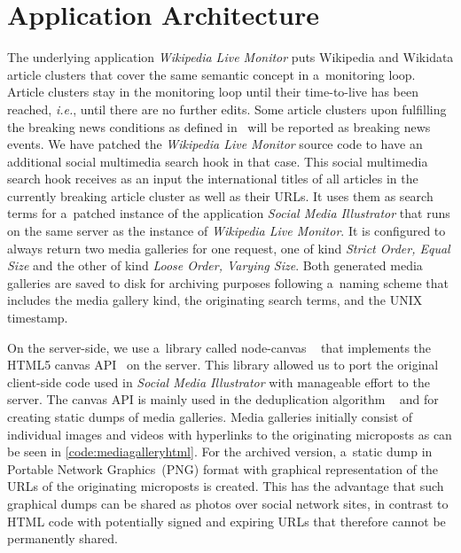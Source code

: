 \documentclass{sig-alternate}
\begin{document}
\section{Application Architecture}
\selectfont

The underlying application \emph{Wikipedia Live Monitor}
puts Wiki\-pedia and Wikidata article clusters
that cover the same semantic concept
in a~monitoring loop.
Article clusters stay in the monitoring loop until
their time-to-live has been reached,
\emph{i.e.}, until there are no further edits.
Some article clusters upon fulfilling the breaking news conditions
as defined in~\cite{steiner2013mjnomore}
will be reported as breaking news events.
We have patched the \emph{Wikipedia Live Monitor} source code
to have an additional social multimedia search hook in that case.
This social multimedia search hook receives as an input
the international titles of all articles
in the currently breaking article cluster as well as their URLs.
It uses them as search terms for a~patched instance
of the application \emph{Social Media Illustrator}
that runs on the same server
as the instance of \emph{Wikipedia Live Monitor}.
It is configured to always return two media galleries
for one request, one of kind \emph{Strict Order, Equal Size}
and the other of kind \emph{Loose Order, Varying Size}.
Both generated media galleries are saved to disk
for archiving purposes following a~naming scheme
that includes the media gallery kind,
the originating search terms, and the UNIX timestamp.

On the server-side, we use a~library called node-canvas%
~\cite{holowaychuk2013nodecanvas} that implements the
HTML5 canvas API~\cite{cabanier2013canvas} on the server.
This library allowed us to port the original client-side code 
used in \emph{Social Media Illustrator}
with manageable effort to the server.
The canvas API is mainly used in the deduplication algorithm%
~\cite{steiner2013clustering}
and for creating static dumps of media galleries.
Media galleries initially consist of individual images and videos
with hyperlinks to the originating microposts
as can be seen in \autoref{code:mediagalleryhtml}.
For the archived version, a~static dump
in Portable Network Graphics~(PNG) format
with graphical representation of the URLs
of the originating microposts is created.
This has the advantage that such graphical dumps
can be shared as photos over social network sites,
in contrast to  HTML code with potentially signed and expiring URLs
that therefore cannot be permanently shared.
\end{document}
